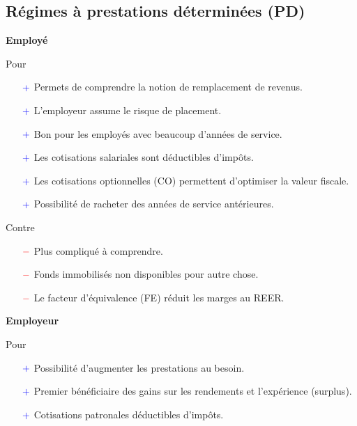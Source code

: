 \documentclass[10pt, french]{article}
\begin{document}
\begin{multicols*}{3}
\subsection*{Régimes à prestations déterminées (PD)}
\begin{center}
	\textbf{Employé}
\end{center}
Pour
\begin{itemize}
	\item[$\color{blue}+$]	Permets de comprendre la notion de remplacement de revenus.
	\item[$\color{blue}+$]	L'employeur assume le risque de placement.
	\item[$\color{blue}+$]	Bon pour les employés avec beaucoup d'années de service.
	\item[$\color{blue}+$]	Les cotisations salariales sont déductibles d'impôts.
	\item[$\color{blue}+$]	Les cotisations optionnelles (CO) permettent d'optimiser la valeur fiscale.
	\item[$\color{blue}+$]	Possibilité de racheter des années de service antérieures.
\end{itemize}

Contre
\begin{itemize}
	\item[$\color{red}-$]	Plus compliqué à comprendre.
	\item[$\color{red}-$]	Fonds immobilisés non disponibles pour autre chose.
	\item[$\color{red}-$]	Le facteur d'équivalence (FE) réduit les marges au REER.
\end{itemize}

\begin{center}
	\textbf{Employeur}
\end{center}
Pour
\begin{itemize}
	\item[$\color{blue}+$]	Possibilité d'augmenter les prestations au besoin.
	\item[$\color{blue}+$]	Premier bénéficiaire des gains sur les rendements et l'expérience (surplus).
	\item[$\color{blue}+$]	Cotisations patronales déductibles d'impôts.
\end{itemize}


\end{multicols*}
\end{document}
